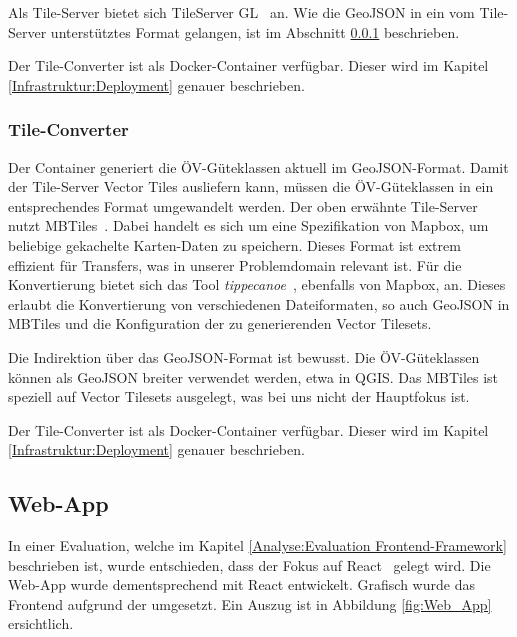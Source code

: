 Als Tile-Server bietet sich TileServer GL~\cite{tile-server-gl} an.
Wie die GeoJSON in ein vom Tile-Server unterstütztes Format gelangen, ist im Abschnitt \ref{Implementation:Tile-Converter} beschrieben.

Der Tile-Converter ist als Docker-Container verfügbar.
Dieser wird im Kapitel \ref{Infrastruktur:Deployment} genauer beschrieben.


\subsubsection{Tile-Converter}
\label{Implementation:Tile-Converter}

Der Container  generiert die \acs{ÖV}-Güteklassen aktuell im GeoJSON-Format.
Damit der Tile-Server Vector Tiles ausliefern kann, müssen die \acs{ÖV}-Güteklassen in ein entsprechendes Format umgewandelt werden.
Der oben erwähnte Tile-Server nutzt MBTiles~\cite{mbtiles}.
Dabei handelt es sich um eine Spezifikation von Mapbox, um beliebige gekachelte Karten-Daten zu speichern.
Dieses Format ist extrem effizient für Transfers, was in unserer Problemdomain relevant ist.
Für die Konvertierung bietet sich das Tool \emph{tippecanoe}~\cite{tippecanoe}, ebenfalls von Mapbox, an.
Dieses erlaubt die Konvertierung von verschiedenen Dateiformaten, so auch GeoJSON in MBTiles und die Konfiguration der zu generierenden Vector Tilesets.

Die Indirektion über das GeoJSON-Format ist bewusst.
Die ÖV-Güteklassen können als GeoJSON breiter verwendet werden, etwa in QGIS.
Das MBTiles ist speziell auf Vector Tilesets ausgelegt, was bei uns nicht der Hauptfokus ist.

Der Tile-Converter ist als Docker-Container verfügbar.
Dieser wird im Kapitel \ref{Infrastruktur:Deployment} genauer beschrieben.

\subsection{Web-App}
\label{Implementation:Web-App}

In einer Evaluation, welche im Kapitel \ref{Analyse:Evaluation Frontend-Framework} beschrieben ist, wurde entschieden, dass der Fokus auf React~\cite{react} gelegt wird.
Die Web-App wurde dementsprechend mit React entwickelt.
Grafisch wurde das Frontend aufgrund der  umgesetzt.
Ein Auszug ist in Abbildung \ref{fig:Web_App} ersichtlich.


